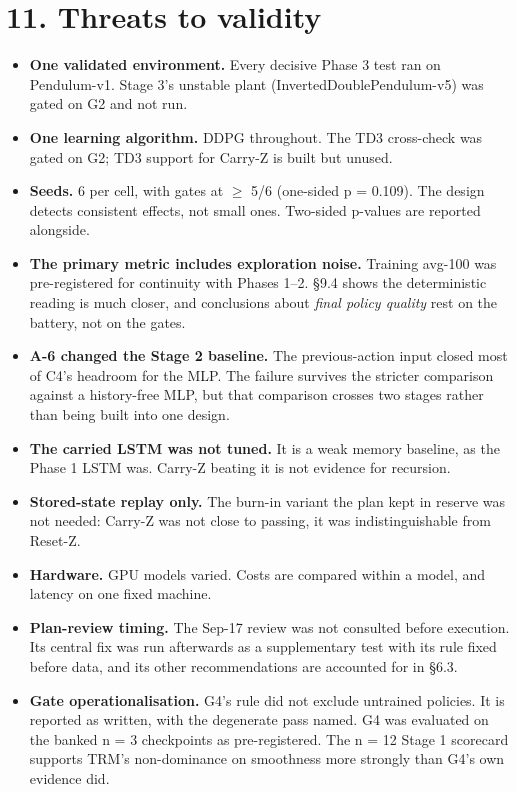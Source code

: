 \documentclass[11pt]{article}
\begin{document}
\medskip



\section*{11. Threats to validity}



\begin{itemize}
\item \textbf{One validated environment.} Every decisive Phase 3 test ran on Pendulum-v1. Stage 3's unstable plant (InvertedDoublePendulum-v5) was gated on G2 and not run.
\item \textbf{One learning algorithm.} DDPG throughout. The TD3 cross-check was gated on G2; TD3 support for Carry-Z is built but unused.
\item \textbf{Seeds.} 6 per cell, with gates at $\geq$ 5/6 (one-sided p = 0.109). The design detects consistent effects, not small ones. Two-sided p-values are reported alongside.
\item \textbf{The primary metric includes exploration noise.} Training avg-100 was pre-registered for continuity with Phases 1--2. \S{}9.4 shows the deterministic reading is much closer, and conclusions about \emph{final policy quality} rest on the battery, not on the gates.
\item \textbf{A-6 changed the Stage 2 baseline.} The previous-action input closed most of C4's headroom for the MLP. The failure survives the stricter comparison against a history-free MLP, but that comparison crosses two stages rather than being built into one design.
\item \textbf{The carried LSTM was not tuned.} It is a weak memory baseline, as the Phase 1 LSTM was. Carry-Z beating it is not evidence for recursion.
\item \textbf{Stored-state replay only.} The burn-in variant the plan kept in reserve was not needed: Carry-Z was not close to passing, it was indistinguishable from Reset-Z.
\item \textbf{Hardware.} GPU models varied. Costs are compared within a model, and latency on one fixed machine.
\item \textbf{Plan-review timing.} The Sep-17 review was not consulted before execution. Its central fix was run afterwards as a supplementary test with its rule fixed before data, and its other recommendations are accounted for in \S{}6.3.
\item \textbf{Gate operationalisation.} G4's rule did not exclude untrained policies. It is reported as written, with the degenerate pass named. G4 was evaluated on the banked n = 3 checkpoints as pre-registered. The n = 12 Stage 1 scorecard supports TRM's non-dominance on smoothness more strongly than G4's own evidence did.
\end{itemize}
\end{document}
